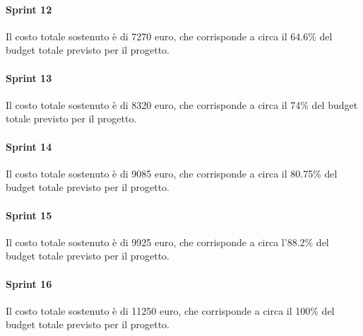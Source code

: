 \paragraph{Sprint 12}
Il costo totale sostenuto è di 7270 euro, che corrisponde a circa il 64.6\% del budget totale previsto per il progetto.

\paragraph{Sprint 13}
Il costo totale sostenuto è di 8320 euro, che corrisponde a circa il 74\% del budget totale previsto per il progetto.

\paragraph{Sprint 14}
Il costo totale sostenuto è di 9085 euro, che corrisponde a circa il 80.75\% del budget totale previsto per il progetto.

\paragraph{Sprint 15}
Il costo totale sostenuto è di 9925 euro, che corrisponde a circa l'88.2\% del budget totale previsto per il progetto.

\paragraph{Sprint 16}
Il costo totale sostenuto è di 11250 euro, che corrisponde a circa il 100\% del budget totale previsto per il progetto.
